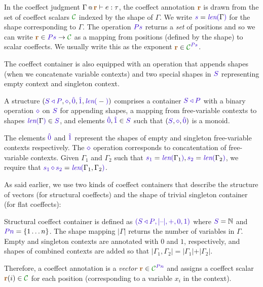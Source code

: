 In the coeffect judgment $\coctx{\Gamma}{\aclrd{\textbf{r}}} \vdash e : \tau$, the coeffect annotation
$\aclrd{\textbf{r}}$ is drawn from the set of coeffect scalars $\C$ indexed by the shape of $\Gamma$.
We write $\sclrd{s} = \slen{\Gamma}$ for the shape corresponding to $\Gamma$. The operation $\SP\sclrd{s}$
returns a \emph{set} of positions and so we can write $\aclrd{\textbf{r}} \in \SP\sclrd{s} \rightarrow \C$ 
as a mapping from positions (defined by the shape) to scalar coeffects. We usually write this as 
the exponent $\aclrd{\textbf{r}} \in \C^{\SP\sclrd{s}}$.

The coeffect container is also equipped with an operation that appends shapes (when we concatenate
variable contexts) and two special shapes in $\SH$ representing empty context and singleton context. 

\begin{definition}
A \emph{} structure $(\SHP, \stimes, \sempty, \sunit, \slen{-})$ 
comprises a container $\SHP$ with a binary operation $\stimes$ on $\SH$ for appending shapes, a 
mapping from free-variable contexts to shapes $\slen{\Gamma} \in \SH$, and elements $\sempty,\sunit \in
\SH$ such that $(\SH, \stimes, \sempty)$ is a monoid.

The elements $\sempty$ and $\sunit$ represent the shapes of empty and singleton free-variable contexts 
respectively. The $\stimes$ operation corresponds to concatentation of free-variable contexts. Given
$\Gamma_1$ and $\Gamma_2$ such that $\sclrd{s_1}=\slen{\Gamma_1}, \sclrd{s_2}=\slen{\Gamma_2}$, 
we require that $\sclrd{s_1}\,\stimes\,\sclrd{s_2}=\slen{\Gamma_1, \Gamma_2}$. 
\end{definition}

\noindent
As said earlier, we use two kinds of coeffect containers that describe the structure of vectors 
(for structural coeffects) and the shape of trivial singleton container (for flat coeffects): 

\begin{example}
\label{ex:unified-struct-shape}
Structural coeffect container is defined as $\sclrd{(\SHP, {|}\textnormal{--}{|}, +, 0, 1)}$
where $\SH=\mathbb{N}$ and $\SP \sclrd{n}=\{ 1 \ldots n \}$. The shape mapping ${|}\Gamma{|}$ returns the 
number of variables in $\Gamma$. Empty and singleton contexts are annotated with $0$ and $1$, 
respectively, and shapes of combined contexts are added so that ${|}\Gamma_1, \Gamma_2{|} = 
{|}\Gamma_1{|} + {|}\Gamma_2{|}$. 

Therefore, a coeffect annotation is a \emph{vector} 
$\aclrd{\textbf{r}} \in \C^{\SP\sclrd{n}}$ and assigns a coeffect scalar $\aclrd{\textbf{r}}(i) \in \C$ 
for each position (corresponding to a variable $x_i$ in the context).
\end{example}

